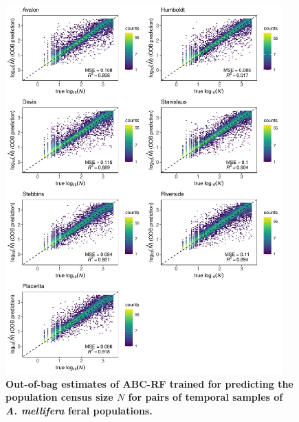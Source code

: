 \documentclass[a4paper, 12pt]{article}
\begin{document}
\begin{figure}[ht]
  \centering
  \includegraphics[width=0.95\textwidth]{Figures/FigureS16_combined_plot_nc.pdf}
  \small\caption{\textbf{Out-of-bag estimates of ABC-RF trained for predicting the population census size $N$ for pairs of temporal samples of \textit{A. mellifera} feral populations.}}
  \label{fig:supple_feralbee_N}
\end{figure}
\end{document}
